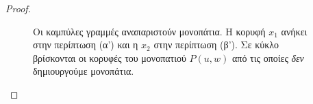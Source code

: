 \documentclass[a4paper, oneside, 11pt]{article}
\theoremstyle{definition}
\begin{document}
\begin{enumerate}
\begin{proof}
\begin{figure}
\begin{center}
      \end{center}
      \caption{Οι καμπύλες γραμμές αναπαριστούν μονοπάτια. Η κορυφή $x_1$
      ανήκει στην περίπτωση (α') και η $x_2$ στην περίπτωση (β'). Σε κύκλο
      βρίσκονται οι κορυφές του μονοπατιού $P(u, w)$ από τις οποίες \emph{δεν}
      δημιουργούμε μονοπάτια.}
      \end{figure}

      \end{proof}
\end{enumerate}
\end{document}
